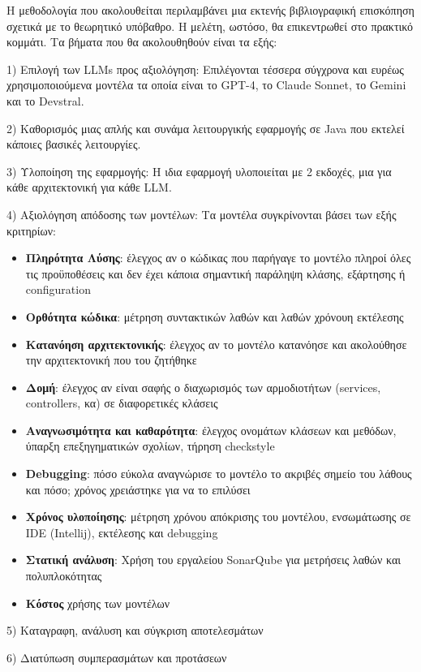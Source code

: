 Η μεθοδολογία που ακολουθείται περιλαμβάνει μια εκτενής βιβλιογραφική επισκόπηση σχετικά με το θεωρητικό υπόβαθρο. Η μελέτη, ωστόσο, θα επικεντρωθεί στο πρακτικό κομμάτι. Τα βήματα που θα ακολουθηθούν είναι τα εξής:

1) Επιλογή των LLMs προς αξιολόγηση: Επιλέγονται τέσσερα σύγχρονα και ευρέως χρησιμοποιούμενα μοντέλα τα οποία είναι το GPT-4, το Claude Sonnet, το Gemini και το Devstral.

2) Καθορισμός μιας απλής και συνάμα λειτουργικής εφαρμογής σε Java που εκτελεί κάποιες βασικές λειτουργίες.

3) Υλοποίηση της εφαρμογής: Η ιδια εφαρμογή υλοποιείται με 2 εκδοχές, μια για κάθε αρχιτεκτονική για κάθε LLM.

4) Αξιολόγηση απόδοσης των μοντέλων: 
Τα μοντέλα συγκρίνονται βάσει των εξής κριτηρίων:

\begin{itemize}
    \item \textbf{Πληρότητα Λύσης}: έλεγχος αν ο κώδικας που παρήγαγε το μοντέλο πληροί όλες τις προϋποθέσεις και δεν έχει κάποια σημαντική παράληψη κλάσης, εξάρτησης ή configuration
    \item \textbf{Ορθότητα κώδικα}: μέτρηση συντακτικών λαθών και λαθών χρόνουη εκτέλεσης
    \item \textbf{Κατανόηση αρχιτεκτονικής}: έλεγχος αν το μοντέλο κατανόησε και ακολούθησε την αρχιτεκτονική που του ζητήθηκε
    \item \textbf{Δομή}: έλεγχος αν είναι σαφής ο διαχωρισμός των αρμοδιοτήτων (services, controllers, κα) σε διαφορετικές κλάσεις
    \item \textbf{Αναγνωσιμότητα και καθαρότητα}: έλεγχος ονομάτων κλάσεων και μεθόδων, ύπαρξη επεξηγηματικών σχολίων, τήρηση checkstyle
    \item \textbf{Debugging}: πόσο εύκολα αναγνώρισε το μοντέλο το ακριβές σημείο του λάθους και πόσο; χρόνος χρειάστηκε για να το επιλύσει
    \item \textbf{Χρόνος υλοποίησης}: μέτρηση χρόνου απόκρισης του μοντέλου, ενσωμάτωσης σε IDE (Intellij), εκτέλεσης και debugging
    \item \textbf{Στατική ανάλυση}: Χρήση του εργαλείου SonarQube για μετρήσεις λαθών και πολυπλοκότητας
    \item \textbf{Κόστος} χρήσης των μοντέλων
\end{itemize}

5) Καταγραφη, ανάλυση και σύγκριση αποτελεσμάτων

6) Διατύπωση συμπερασμάτων και προτάσεων
